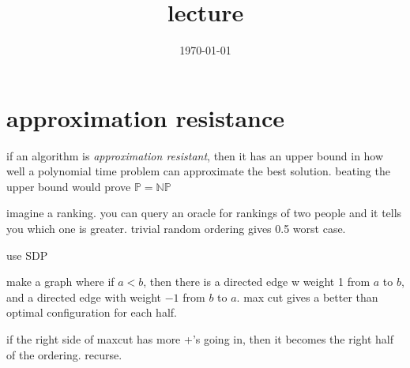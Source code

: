 \documentclass{article}
\title{lecture}
\date{\today}
\theoremstyle{definition}
\begin{document}
\maketitle

\section{approximation resistance}
if an algorithm is \emph{approximation resistant}, then it has an upper bound in how well a polynomial time problem can approximate the best solution. beating the upper bound would prove \(\mathbb P=\mathbb{NP}\)



imagine a ranking. you can query an oracle for rankings of two people and it tells you which one is greater. trivial random ordering gives 0.5 worst case.

use SDP

make a graph where if \(a<b\), then there is a directed edge w weight 1 from \(a\) to \(b\), and a directed edge with weight \(-1\) from \(b\) to \(a\). max cut gives a better than optimal configuration for each half. 

if the right side of maxcut has more +'s going in, then it becomes the right half of the ordering. recurse. 
\end{document}
